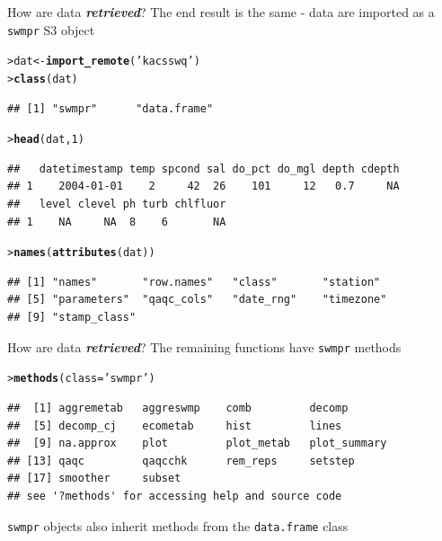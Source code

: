 \documentclass[serif]{beamer}\usepackage[]{graphicx}\usepackage[]{color}
\makeatletter
\newcommand{\hlnum}[1]{\textcolor[rgb]{0.686,0.059,0.569}{#1}}%
\newcommand{\hlstr}[1]{\textcolor[rgb]{0.192,0.494,0.8}{#1}}%
\newcommand{\hlstd}[1]{\textcolor[rgb]{0.345,0.345,0.345}{#1}}%
\newcommand{\hlkwb}[1]{\textcolor[rgb]{0.69,0.353,0.396}{#1}}%
\newcommand{\hlkwc}[1]{\textcolor[rgb]{0.333,0.667,0.333}{#1}}%
\newcommand{\hlkwd}[1]{\textcolor[rgb]{0.737,0.353,0.396}{\textbf{#1}}}%
\newenvironment{kframe}{%
 \def\at@end@of@kframe{}%
 \ifinner\ifhmode%
  \def\at@end@of@kframe{\end{minipage}}%
  \begin{minipage}{\columnwidth}%
 \fi\fi%
 \def\FrameCommand##1{\hskip\@totalleftmargin \hskip-\fboxsep
 \colorbox{shadecolor}{##1}\hskip-\fboxsep
     \hskip-\linewidth \hskip-\@totalleftmargin \hskip\columnwidth}%
 \MakeFramed {\advance\hsize-\width
   \@totalleftmargin\z@ \linewidth\hsize
   \@setminipage}}%
 {\par\unskip\endMakeFramed%
 \at@end@of@kframe}
\newenvironment{knitrout}{}{} %
\newcommand{\Bigtxt}[1]{\textbf{\textit{#1}}}
\makeatother
\begin{document}
\begin{frame}{How are data \Bigtxt{retrieved}?}
The end result is the same - data are imported as a \texttt{swmpr} S3 object
\begin{knitrout}\small
{}\color{fgcolor}\begin{kframe}
\begin{alltt}
\hlstd{> }\hlstd{dat} \hlkwb{<-} \hlkwd{import_remote}\hlstd{(}\hlstr{'kacsswq'}\hlstd{)}
\hlstd{> }\hlkwd{class}\hlstd{(dat)}
\end{alltt}
\begin{verbatim}
## [1] "swmpr"      "data.frame"
\end{verbatim}
\begin{alltt}
\hlstd{> }\hlkwd{head}\hlstd{(dat,} \hlnum{1}\hlstd{)}
\end{alltt}
\begin{verbatim}
##   datetimestamp temp spcond sal do_pct do_mgl depth cdepth
## 1    2004-01-01    2     42  26    101     12   0.7     NA
##   level clevel ph turb chlfluor
## 1    NA     NA  8    6       NA
\end{verbatim}
\begin{alltt}
\hlstd{> }\hlkwd{names}\hlstd{(}\hlkwd{attributes}\hlstd{(dat))}
\end{alltt}
\begin{verbatim}
## [1] "names"       "row.names"   "class"       "station"    
## [5] "parameters"  "qaqc_cols"   "date_rng"    "timezone"   
## [9] "stamp_class"
\end{verbatim}
\end{kframe}
\end{knitrout}
\end{frame}

\begin{frame}[fragile,t]{How are data \Bigtxt{retrieved}?}
The remaining functions have \texttt{swmpr} methods
\begin{knitrout}\small
{}\color{fgcolor}\begin{kframe}
\begin{alltt}
\hlstd{> }\hlkwd{methods}\hlstd{(}\hlkwc{class} \hlstd{=} \hlstr{'swmpr'}\hlstd{)}
\end{alltt}
\begin{verbatim}
##  [1] aggremetab   aggreswmp    comb         decomp      
##  [5] decomp_cj    ecometab     hist         lines       
##  [9] na.approx    plot         plot_metab   plot_summary
## [13] qaqc         qaqcchk      rem_reps     setstep     
## [17] smoother     subset      
## see '?methods' for accessing help and source code
\end{verbatim}
\end{kframe}
\end{knitrout}
\texttt{swmpr} objects also inherit methods from the \texttt{data.frame} class
\end{frame}
\end{document}
